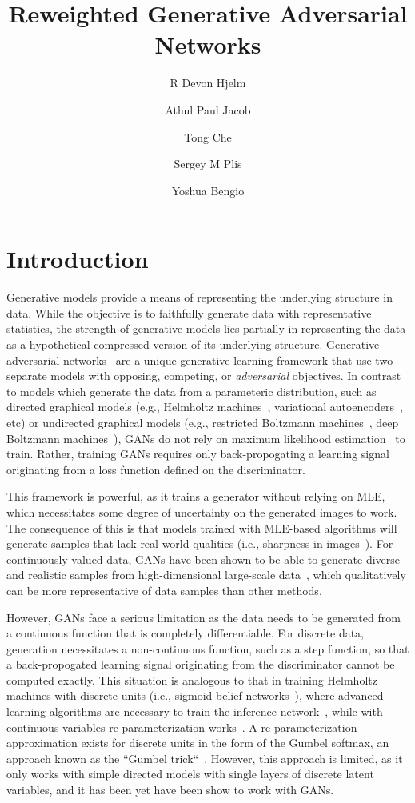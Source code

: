 \documentclass[10pt]{article}
\title{Reweighted Generative Adversarial Networks}
\author{R Devon Hjelm
\and
Athul Paul Jacob
\and
Tong Che
\and
Sergey M Plis
\and 
Yoshua Bengio}
\begin{document}
\maketitle
{}

\section{Introduction}
Generative models provide a means of representing the underlying structure in data.
While the objective is to faithfully generate data with representative statistics, the strength of generative models lies partially in representing the data as a hypothetical compressed version of its underlying structure.
Generative adversarial networks~\citep[GANs, ][]{goodfellow2014generative} are a unique generative learning framework that use two separate models with opposing, competing, or \emph{adversarial} objectives.
In contrast to models which generate the data from a parameteric distribution, such as directed graphical models (e.g., Helmholtz machines~\citep{dayan1995helmholtz}, variational autoencoders~\citep[VAEs,][]{kingma2013auto}, etc) or undirected graphical models (e.g., restricted Boltzmann machines~\citep[RBMs,][]{hinton2002training}, deep Boltzmann machines~\citep[DBMs,][]{salakhutdinov2009deep}), GANs do not rely on maximum likelihood estimation~\citep[MLE,][]{dempster1977maximum} to train.
Rather, training GANs requires only back-propogating a learning signal originating from a loss function defined on the discriminator.

This framework is powerful, as it trains a generator without relying on MLE, which necessitates some degree of uncertainty on the generated images to work.
The consequence of this is that models trained with MLE-based algorithms will generate samples that lack real-world qualities (i.e., sharpness in images~\citep{goodfellow2016nips}).
For continuously valued data, GANs have been shown to be able to generate diverse and realistic samples from high-dimensional large-scale data~\citep{radford2015unsupervised}, which qualitatively can be more representative of data samples than other methods. 

However, GANs face a serious limitation as the data needs to be generated from a continuous function that is completely differentiable.
For discrete data, generation necessitates a non-continuous function, such as a step function, so that a back-propogated learning signal originating from the discriminator cannot be computed exactly.
This situation is analogous to that in training Helmholtz machines with discrete units (i.e., sigmoid belief networks~\citep[SBNs,][]{saul1996mean}), where advanced learning algorithms are necessary to train the inference network~\citep{mnih2014neural, bornschein2014reweighted}, while with continuous variables re-parameterization works~\citep{kingma2013auto}.
A re-parameterization approximation exists for discrete units in the form of the Gumbel softmax, an approach known as the ``Gumbel trick``~\citep{gumbel1954statistical, jang2016categorical}.
However, this approach is limited, as it only works with simple directed models with single layers of discrete latent variables, and it has been yet have been show to work with GANs.
\end{document}
